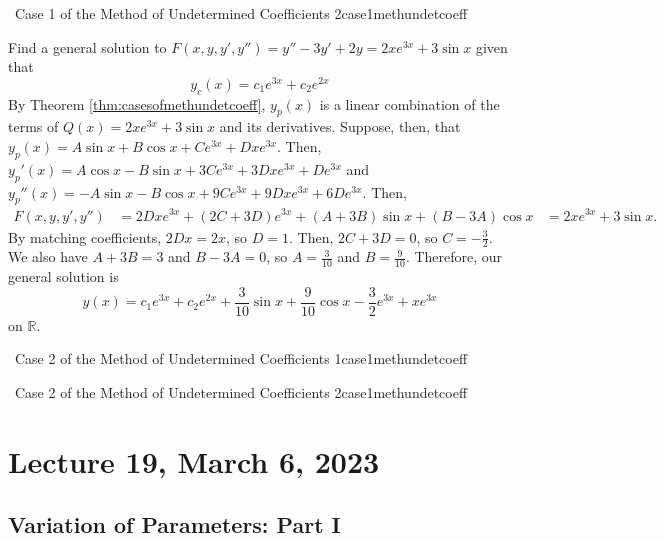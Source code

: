     \begin{example}{\Difficulty\,\Difficulty\,\,Case 1 of the Method of Undetermined Coefficients 2}{case1methundetcoeff}
        
        Find a general solution to \(F(x,y,y',y'')=y''-3y'+2y=2xe^{3x}+3\sin x\) given that
        \begin{equation*}
            y_c(x)=c_1e^{3x}+c_2e^{2x}
        \end{equation*}
        By Theorem \ref{thm:casesofmethundetcoeff}, \(y_p(x)\) is a linear combination of the terms of \(Q(x)=2xe^{3x}+3\sin x\) and its derivatives. Suppose, then, that \(y_p(x)=A\sin x+B\cos x+Ce^{3x}+Dxe^{3x}\). Then, \(y_p'(x)=A\cos x-B\sin x+3Ce^{3x}+3Dxe^{3x}+De^{3x}\) and \(y_p''(x)=-A\sin x-B\cos x+9Ce^{3x}+9Dxe^{3x}+6De^{3x}\). Then,
        \begin{align*}
            F(x,y,y',y'')&=2Dxe^{3x}+(2C+3D)e^{3x}+(A+3B)\sin x+(B-3A)\cos x &= 2xe^{3x}+3\sin x.
        \end{align*}
        By matching coefficients, \(2Dx=2x\), so \(D=1\). Then, \(2C+3D=0\), so \(C=-\frac{3}{2}\). We also have \(A+3B=3\) and \(B-3A=0\), so \(A=\frac{3}{10}\) and \(B=\frac{9}{10}\). Therefore, our general solution is
        \begin{equation*}
            y(x)=c_1e^{3x}+c_2e^{2x}+\frac{3}{10}\sin x+\frac{9}{10}\cos x-\frac{3}{2}e^{3x}+xe^{3x}
        \end{equation*}
        on \(\mathbb{R}\).

    \end{example}
    \begin{example}{\Difficulty\,\Difficulty\,\,Case 2 of the Method of Undetermined Coefficients 1}{case1methundetcoeff}
        
        

    \end{example}
    \begin{example}{\Difficulty\,\Difficulty\,\,Case 2 of the Method of Undetermined Coefficients 2}{case1methundetcoeff}
        
    \end{example}

\pagebreak

\section{Lecture 19, March 6, 2023}

    \subsection{Variation of Parameters: Part I}

